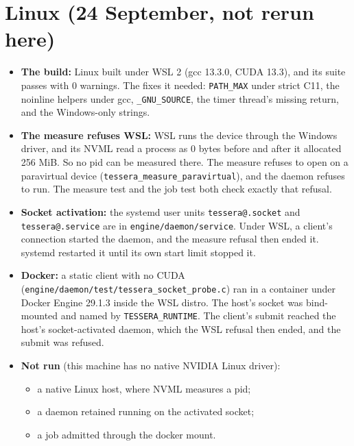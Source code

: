 \section{\texorpdfstring{Linux (24 September, not rerun here)}{Linux (24 September, not rerun here)}}

\begin{itemize}
\item \textbf{The build:} Linux built under WSL 2 (gcc 13.3.0, CUDA 13.3), and its suite passes with 0 warnings. The fixes it needed: \texttt{PATH\_\allowbreak{}MAX} under strict C11, the noinline helpers under gcc, \texttt{\_\allowbreak{}GNU\_\allowbreak{}SOURCE}, the timer thread's missing return, and the Windows-only strings.
\item \textbf{The measure refuses WSL:} WSL runs the device through the Windows driver, and its NVML read a process as 0 bytes before and after it allocated 256 MiB. So no pid can be measured there. The measure refuses to open on a paravirtual device (\texttt{tessera\_\allowbreak{}measure\_\allowbreak{}paravirtual}), and the daemon refuses to run. The measure test and the job test both check exactly that refusal.
\item \textbf{Socket activation:} the systemd user units \texttt{tessera@.\allowbreak{}socket} and \texttt{tessera@.\allowbreak{}service} are in \texttt{engine/\allowbreak{}daemon/\allowbreak{}service}. Under WSL, a client's connection started the daemon, and the measure refusal then ended it. systemd restarted it until its own start limit stopped it.
\item \textbf{Docker:} a static client with no CUDA (\texttt{engine/\allowbreak{}daemon/\allowbreak{}test/\allowbreak{}tessera\_\allowbreak{}socket\_\allowbreak{}probe.\allowbreak{}c}) ran in a container under Docker Engine 29.1.3 inside the WSL distro. The host's socket was bind-mounted and named by \texttt{TESSERA\_\allowbreak{}RUNTIME}. The client's submit reached the host's socket-activated daemon, which the WSL refusal then ended, and the submit was refused.
\item \textbf{Not run} (this machine has no native NVIDIA Linux driver):

\begin{itemize}
\item a native Linux host, where NVML measures a pid;
\item a daemon retained running on the activated socket;
\item a job admitted through the docker mount.
\end{itemize}
\end{itemize}
